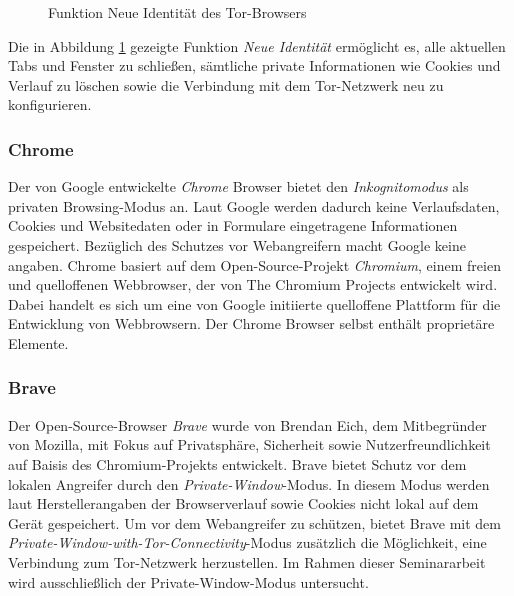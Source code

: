 \begin{figure}[h!]
	\caption{Funktion \glqq{}Neue Identität\grqq{} des Tor-Browsers}
	\label{img:tor-new-identity}
\end{figure}
Die in Abbildung \ref{img:tor-new-identity} gezeigte Funktion \glqq{}\textit{Neue Identität}\grqq{} ermöglicht es, alle aktuellen Tabs und Fenster zu schließen, sämtliche private Informationen wie Cookies und Verlauf zu löschen sowie die Verbindung mit dem Tor-Netzwerk neu zu konfigurieren. \cite{Tor.24.05.2023}

\subsubsection*{Chrome}
\label{subsubsection:methodik-vorbereitung-browserauswahl-chrome}
Der von Google entwickelte \textit{Chrome} Browser bietet den \textit{Inkognitomodus} als privaten Browsing-Modus an. Laut Google werden dadurch keine Verlaufsdaten, Cookies und Websitedaten oder in Formulare eingetragene Informationen gespeichert.
Bezüglich des Schutzes vor Webangreifern macht Google keine angaben.
Chrome basiert auf dem Open-Source-Projekt \textit{Chromium}, einem freien und quelloffenen Webbrowser, der von The Chromium Projects entwickelt wird.
Dabei handelt es sich um eine von Google initiierte quelloffene Plattform für die Entwicklung von Webbrowsern.
Der Chrome Browser selbst enthält proprietäre Elemente. \cite{GoogleChrome.}

\subsubsection*{Brave}
\label{subsubsection:methodik-vorbereitung-browserauswahl-brave}
Der Open-Source-Browser \textit{Brave} wurde von Brendan Eich, dem Mitbegründer von Mozilla, mit Fokus auf Privatsphäre, Sicherheit sowie Nutzerfreundlichkeit auf Baisis des Chromium-Projekts entwickelt. 
Brave bietet Schutz vor dem lokalen Angreifer durch den \textit{Private-Window}-Modus. In diesem Modus werden laut Herstellerangaben der Browserverlauf sowie Cookies nicht lokal auf dem Gerät gespeichert. 
Um vor dem Webangreifer zu schützen, bietet Brave mit dem \textit{Private-Window-with-Tor-Connectivity}-Modus zusätzlich die Möglichkeit, eine Verbindung zum Tor-Netzwerk herzustellen. \cite{Brave.} Im Rahmen dieser Seminararbeit wird ausschließlich der Private-Window-Modus untersucht.

